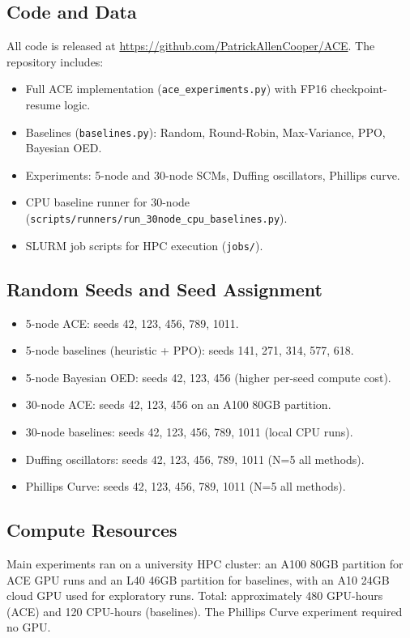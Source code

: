 \subsection{Code and Data}

All code is released at \url{https://github.com/PatrickAllenCooper/ACE}. The repository includes:
\begin{itemize}[leftmargin=1.2em,topsep=0.2em,itemsep=0.1em]
\item Full ACE implementation (\texttt{ace\_experiments.py}) with FP16 checkpoint-resume logic.
\item Baselines (\texttt{baselines.py}): Random, Round-Robin, Max-Variance, PPO, Bayesian OED.
\item Experiments: 5-node and 30-node SCMs, Duffing oscillators, Phillips curve.
\item CPU baseline runner for 30-node (\texttt{scripts/runners/run\_30node\_cpu\_baselines.py}).
\item SLURM job scripts for HPC execution (\texttt{jobs/}).
\end{itemize}

\subsection{Random Seeds and Seed Assignment}

\begin{itemize}[leftmargin=1.2em,topsep=0.2em,itemsep=0.1em]
\item 5-node ACE: seeds 42, 123, 456, 789, 1011.
\item 5-node baselines (heuristic + PPO): seeds 141, 271, 314, 577, 618.
\item 5-node Bayesian OED: seeds 42, 123, 456 (higher per-seed compute cost).
\item 30-node ACE: seeds 42, 123, 456 on an A100 80GB partition.
\item 30-node baselines: seeds 42, 123, 456, 789, 1011 (local CPU runs).
\item Duffing oscillators: seeds 42, 123, 456, 789, 1011 (N=5 all methods).
\item Phillips Curve: seeds 42, 123, 456, 789, 1011 (N=5 all methods).
\end{itemize}

\subsection{Compute Resources}

Main experiments ran on a university HPC cluster: an A100 80GB partition for ACE GPU runs and an L40 46GB partition for baselines, with an A10 24GB cloud GPU used for exploratory runs. Total: approximately 480 GPU-hours (ACE) and 120 CPU-hours (baselines). The Phillips Curve experiment required no GPU.

